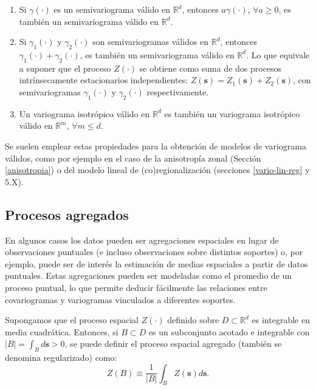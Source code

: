\documentclass[
  spanish,
]{book}
\theoremstyle{break}
\theoremstyle{definition}
\theoremstyle{definition}
\theoremstyle{definition}
\theoremstyle{definition}
\theoremstyle{remark}
\begin{document}
\begin{enumerate}
\def\labelenumi{\arabic{enumi}.}
\item
  Si \(\gamma (\cdot)\) es un semivariograma válido en \(\mathbb{R}^d\), entonces \(a\gamma (\cdot)\), \(\forall a\geq 0\), es también un semivariograma válido en \(\mathbb{R}^d\).
\item
  Si \(\gamma_1 (\cdot)\) y \(\gamma_2 (\cdot)\) son semivariogramas válidos en \(\mathbb{R}^d\), entonces \(\gamma_1 (\cdot)+\gamma_2 (\cdot)\), es también un semivariograma válido en \(\mathbb{R}^d\). Lo que equivale a suponer que el proceso \(Z(\cdot)\) se obtiene como suma de dos procesos intrínsecamente estacionarios independientes: \(Z(\mathbf{s})=Z_1 (\mathbf{s})+Z_2 (\mathbf{s})\), con semivariogramas \(\gamma_1 (\cdot)\) y \(\gamma_2 (\cdot)\) respectivamente.
\item
  Un variograma isotrópico válido en \(\mathbb{R}^d\) es también un variograma isotrópico válido en \(\mathbb{R}^m\), \(\forall m\leq d\).
\end{enumerate}

Se suelen emplear estas propiedades para la obtención de modelos de variograma válidos, como por ejemplo en el caso de la anisotropía zonal (Sección \ref{anisotropia}) o del modelo lineal de (co)regionalización (secciones \ref{vario-lin-reg} y 5.X).

\hypertarget{procesos-agregados}{%
\subsection{Procesos agregados}\label{procesos-agregados}}

En algunos casos los datos pueden ser agregaciones espaciales en lugar de observaciones puntuales (e incluso observaciones sobre distintos soportes) o, por ejemplo, puede ser de interés la estimación de medias espaciales a partir de datos puntuales.
Estas agregaciones pueden ser modeladas como el promedio de un proceso puntual, lo que permite deducir fácilmente las relaciones entre covariogramas y variogramas vinculados a diferentes soportes.

Supongamos que el proceso espacial \(Z(\cdot)\) definido sobre \(D\subset \mathbb{R} ^{d}\) es integrable en media cuadrática.
Entonces, si \(B\subset D\) es un subconjunto acotado e integrable con \(\left| B\right| =\int_B d\mathbf{s} > 0\), se puede definir el proceso espacial agregado (también se denomina regularizado) como:
\[Z(B)\equiv \dfrac{1}{\left| B\right| } \int_{B}Z(\mathbf{s})d\mathbf{s}.\]
\end{document}
